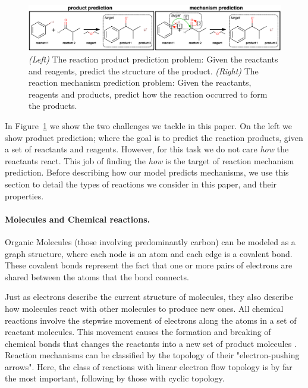 

\begin{figure}[t!]
\centering
\includegraphics[width=\textwidth]{reaction_diagram}
\caption{\emph{(Left)} The reaction product prediction problem: Given the reactants and reagents, predict the structure of the product. \emph{(Right)} The reaction mechanism prediction problem: Given the reactants, reagents and products, predict how the reaction occurred to form the products.}
\label{fig:task-overview}
\end{figure}


In Figure~\ref{fig:task-overview} we show the two challenges we tackle in this paper. 
On the left we show product prediction; where the goal is to predict the reaction products, given a set of reactants and reagents. However, for this task we do not care {\em how} the reactants react.
 This job of finding the {\em how} is the target of reaction mechanism prediction. 
 Before describing how our model predicts mechanisms, we use this section to detail the types of reactions we consider in this paper, and their properties.



\vspace{-0.15cm}
\paragraph{Molecules and Chemical reactions.}


Organic Molecules (those involving predominantly carbon) can be modeled as a graph structure, where each node is an atom and each edge is a covalent bond.
These covalent bonds represent the fact that 
one or more pairs of electrons are shared between the atoms that the bond connects. 


Just as electrons describe the current structure of molecules, 
they also describe how molecules react with other molecules to produce new ones. All chemical reactions involve the stepwise movement of electrons along the atoms in a set of reactant molecules. 
This movement causes the formation and breaking of chemical bonds that changes the reactants into a new set of product molecules \cite{herges1994coarctate}. 
Reaction mechanisms can be classified by the topology of their "electron-pushing arrows". Here, the class of reactions with linear electron flow topology is by far the most important, following by those with cyclic topology.\cite{herges1994coarctate}

